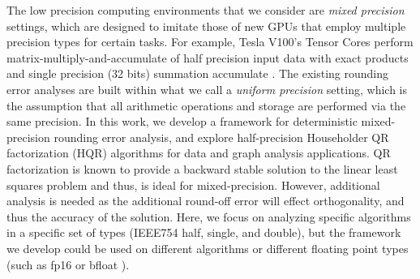 \documentclass[review,onefignum,onetabnum]{siamart190516}
\begin{document}
The low precision computing environments that we consider are \emph{mixed precision} settings, which are designed to imitate those of new GPUs that employ multiple precision types for certain tasks. 
For example, Tesla V100's Tensor Cores perform matrix-multiply-and-accumulate of half precision input data with exact products and single precision (32 bits) summation accumulate \cite{nvdia}.
The existing rounding error analyses are built within what we call a \emph{uniform precision} setting, which is the assumption that all arithmetic operations and storage are performed via the same precision.
In this work, we develop a framework for deterministic mixed-precision rounding error analysis, and explore half-precision Householder QR factorization (HQR) algorithms for data and graph analysis applications. 
QR factorization is known to provide a backward stable solution to the linear least squares problem and thus, is ideal for mixed-precision. 
However, additional analysis is needed as the additional round-off error will effect orthogonality, and thus the accuracy of the solution. 
Here, we focus on analyzing specific algorithms in a specific set of types (IEEE754 half, single, and double), but the framework we develop 
could be used on different algorithms or different floating point types (such as fp16 or bfloat \cite{tagliavini2018floating}).\par
\end{document}
